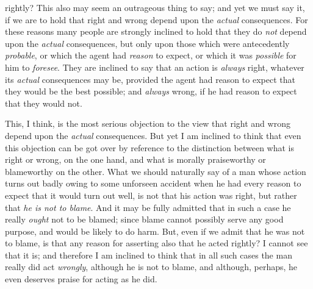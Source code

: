 rightly? This also  may seem an outrageous thing to say;
and yet we must say it, if we are to hold that right and wrong depend
upon the \textit{actual} consequences. For these reasons many people
are strongly inclined to hold that they do \textit{not} depend upon
the \textit{actual} consequences, but only upon those which were
antecedently \textit{probable}, or which the agent had \textit{reason}
to expect, or which it was \textit{possible} for him to
\textit{foresee}. They are inclined to say that an action is
\textit{always} right, whatever its \textit{actual} consequences may
be, provided the agent had reason to expect that they would be the
best possible; and \textit{always} wrong, if he had reason to expect
that they would not.

This, I think, is the most serious objection to the view that right
and wrong depend upon the \textit{actual} consequences. But yet I am
inclined to think that even this objection can be got over by
reference to the distinction between what is right or wrong, on the
one hand, and what is morally praiseworthy or blameworthy on the
other. What we should naturally say of a man whose action turns out
badly owing to some unforseen accident when he had every reason to
expect that it  would turn out well, is not that his action
was right, but rather that \textit{he is not to blame}. And it may be
fully admitted that in such a case he really \textit{ought} not to be
blamed; since blame cannot possibly serve any good purpose, and would
be likely to do harm. But, even if we admit that he was not to blame,
is that any reason for asserting also that he acted rightly? I cannot
see that it is; and therefore I am inclined to think that in all such
cases the man really did act \textit{wrongly}, although he is not to
blame, and although, perhaps, he even deserves praise for acting as he
did.

